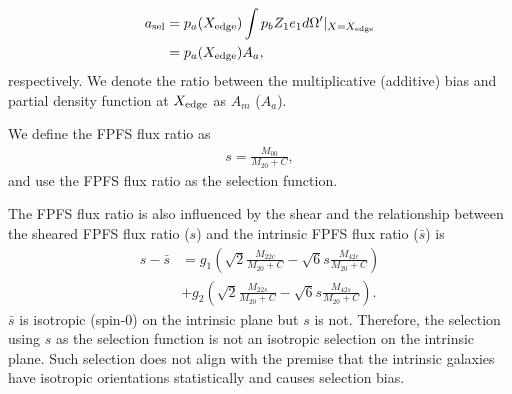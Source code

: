 \begin{equation}
\begin{split}
a_{\rm{sel}}&=p_a(X_{\rm{edge}}) \int p_b Z_1 e_1 d\Omega'|_{X=X_{\rm{edge}}} \\
            &=p_a(X_{\rm{edge}}) A_a,
\end{split}
\end{equation}
respectively. We denote the ratio between the multiplicative (additive) bias and partial density function
at $X_{\rm{edge}}$ as $A_{m}$ ($A_{a}$).

We define the FPFS flux ratio as
\begin{align}\label{select_define}
s = \frac{M_{00}}{M_{20}+C},
\end{align}
and use the FPFS flux ratio as the selection function.

The FPFS flux ratio is also influenced by the shear and the relationship
between the sheared FPFS flux ratio ($s$) and the intrinsic FPFS flux ratio
($\bar{s}$) is
\begin{align}\label{select_transform}
s-\bar{s} &=g_1 (\sqrt{2}\frac{M_{22c}}{M_{20}+C}
    -\sqrt{6}s\frac{M_{42c}}{M_{20}+C}) \\
    &+g_2 (\sqrt{2}\frac{M_{22s}}{M_{20}+C}
    -\sqrt{6}s\frac{M_{42s}}{M_{20}+C}).
\end{align}
$\bar{s}$ is isotropic (spin-0) on the intrinsic plane but $s$ is not.
Therefore, the selection using $s$ as the selection function is not an
isotropic selection on the intrinsic plane. Such selection does not align with
the premise that the intrinsic galaxies have isotropic orientations
statistically and causes selection bias.


